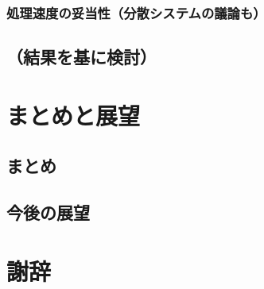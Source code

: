 \documentclass[12pt,a4j]{jreport}
\begin{document}
\subsection{処理速度の妥当性（分散システムの議論も）}


\section{（結果を基に検討）}


\chapter{まとめと展望}


\section{まとめ}


\section{今後の展望}


\chapter*{謝辞}




\end{document}
